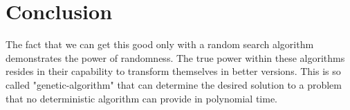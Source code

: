 \documentclass{article}
\begin{document}


\section{Conclusion}
The fact that we can get this good only with a random search algorithm demonstrates the power of randomness.
The true power within these algorithms resides in their capability to transform themselves in better versions. 
This is so called "genetic-algorithm" that can determine the desired solution to a problem that no deterministic algorithm can provide in polynomial time.
\end{document}
